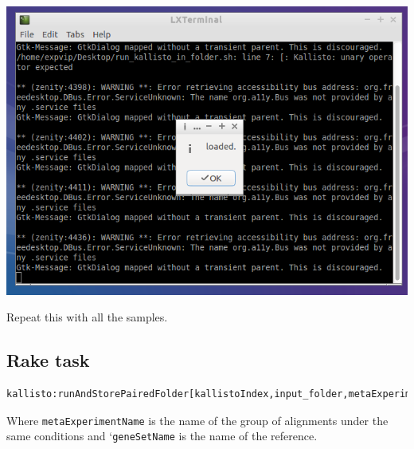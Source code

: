 \begin{enumerate}
  \includegraphics{images/KallistoBatch07.png}
\end{enumerate}

Repeat this with all the samples.

\subsection{Rake task}\label{rake-task}

\begin{lstlisting}[language=sh]
kallisto:runAndStorePairedFolder[kallistoIndex,input_folder,metaExperimentName,geneSetName]
\end{lstlisting}

Where \lstinline!metaExperimentName! is the name of the group of
alignments under the same conditions and `\lstinline!geneSetName! is the
name of the reference.
